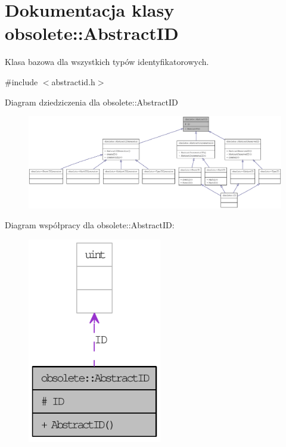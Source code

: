 \hypertarget{classobsolete_1_1AbstractID}{
\section{Dokumentacja klasy obsolete::AbstractID}
\label{classobsolete_1_1AbstractID}
}


Klasa bazowa dla wszystkich typów identyfikatorowych.  




{\ttfamily \#include $<$abstractid.h$>$}



Diagram dziedziczenia dla obsolete::AbstractID\nopagebreak
\begin{figure}[H]
\begin{center}
\leavevmode
\includegraphics[width=400pt]{classobsolete_1_1AbstractID__inherit__graph}
\end{center}
\end{figure}


Diagram współpracy dla obsolete::AbstractID:\nopagebreak
\begin{figure}[H]
\begin{center}
\leavevmode
\includegraphics[width=166pt]{classobsolete_1_1AbstractID__coll__graph}
\end{center}
\end{figure}
